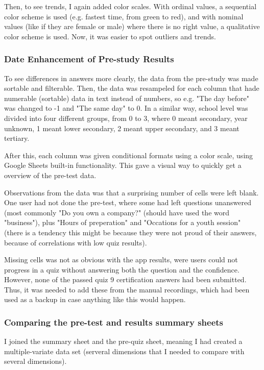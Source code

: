 Then, to see trends, I again added color scales. With ordinal values, a sequential color scheme is used (e.g. fastest time, from green to red), and with nominal values (like if they are female or male) where there is no right value, a qualitative color scheme is used. Now, it was easier to spot outliers and trends.

\subsubsection{Date Enhancement of Pre-study Results}
To see differences in answers more clearly, the data from the pre-study was made sortable and filterable. Then, the data was resampeled for each column that hade numerable (sortable) data in text instead of numbers, so e.g. "The day before" was changed to -1 and "The same day" to 0. In a similar way, school level was divided into four different groups, from 0 to 3, where 0 meant secondary, year unknown, 1 meant lower secondary, 2 meant upper secondary, and 3 meant tertiary.

After this, each column was given conditional formats using a color scale, using Google Sheets built-in functionality. This gave a visual way to quickly get a overview of the pre-test data.

Observations from the data was that a surprising number of cells were left blank. One user had not done the pre-test, where some had left questions unanswered (most commonly "Do you own a company?" (should have used the word "business"), plus "Hours of preperation" and "Occations for a youth session" (there is a tendency this might be because they were not proud of their answers, because of correlations with low quiz results).

Missing cells was not as obvious with the app results, were users could not progress in a quiz without answering both the question and the confidence. However, none of the passed quiz 9 certification answers had been submitted. Thus, it was needed to add these from the manual recordings, which had been used as a backup in case anything like this would happen.

\subsubsection{Comparing the pre-test and results summary sheets}

I joined the summary sheet and the pre-quiz sheet, meaning I had created a multiple-variate data set (serveral dimensions that I needed to compare with several dimensions).

